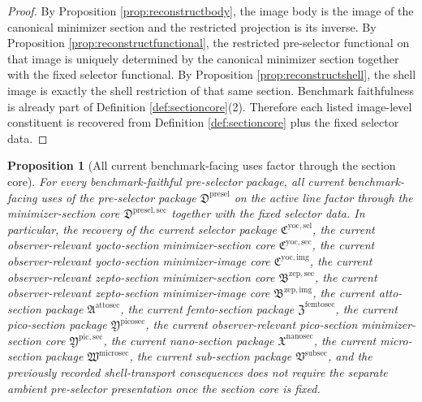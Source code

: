 \documentclass[11pt]{article}
\newcommand{\SubSectionPackage}{\mathfrak V^{\mathrm{subsec}}}
\newcommand{\MicroSectionPackage}{\mathfrak W^{\mathrm{microsec}}}
\newcommand{\NanoSectionPackage}{\mathfrak X^{\mathrm{nanosec}}}
\newcommand{\PicoSectionPackage}{\mathfrak Y^{\mathrm{picosec}}}
\newcommand{\PicoMinSectionCore}{\mathfrak Y^{\mathrm{pic,sec}}}
\newcommand{\FemtoSectionPackage}{\mathfrak Z^{\mathrm{femtosec}}}
\newcommand{\AttoSectionPackage}{\mathfrak A^{\mathrm{attosec}}}
\newcommand{\ZeptoImageCore}{\mathfrak B^{\mathrm{zep,img}}}
\newcommand{\ZeptoMinSectionCore}{\mathfrak B^{\mathrm{zep,sec}}}
\newcommand{\YoctoImageCore}{\mathfrak C^{\mathrm{yoc,img}}}
\newcommand{\YoctoMinSectionCore}{\mathfrak C^{\mathrm{yoc,sec}}}
\newcommand{\YoctoSelectorPackage}{\mathfrak C^{\mathrm{yoc,sel}}}
\newcommand{\PreSelectorPackage}{\mathfrak D^{\mathrm{presel}}}
\newcommand{\PreSelectorMinSectionCore}{\mathfrak D^{\mathrm{presel,sec}}}
\newtheorem{proposition}{Proposition}
\begin{document}
\begin{proof}
By Proposition \ref{prop:reconstructbody}, the image body is the image of the canonical minimizer section and the restricted projection is its inverse. By Proposition \ref{prop:reconstructfunctional}, the restricted pre-selector functional on that image is uniquely determined by the canonical minimizer section together with the fixed selector functional. By Proposition \ref{prop:reconstructshell}, the shell image is exactly the shell restriction of that same section. Benchmark faithfulness is already part of Definition \ref{def:sectioncore}(2). Therefore each listed image-level constituent is recovered from Definition \ref{def:sectioncore} plus the fixed selector data.
\end{proof}

\begin{proposition}[All current benchmark-facing uses factor through the section core]
\label{prop:downstream}
For every benchmark-faithful pre-selector package, all current benchmark-facing uses of the pre-selector package \(\PreSelectorPackage\) on the active line factor through the minimizer-section core \(\PreSelectorMinSectionCore\) together with the fixed selector data. In particular, the recovery of the current selector package \(\YoctoSelectorPackage\), the current observer-relevant yocto-section minimizer-section core \(\YoctoMinSectionCore\), the current observer-relevant yocto-section minimizer-image core \(\YoctoImageCore\), the current observer-relevant zepto-section minimizer-section core \(\ZeptoMinSectionCore\), the current observer-relevant zepto-section minimizer-image core \(\ZeptoImageCore\), the current atto-section package \(\AttoSectionPackage\), the current femto-section package \(\FemtoSectionPackage\), the current pico-section package \(\PicoSectionPackage\), the current observer-relevant pico-section minimizer-section core \(\PicoMinSectionCore\), the current nano-section package \(\NanoSectionPackage\), the current micro-section package \(\MicroSectionPackage\), the current sub-section package \(\SubSectionPackage\), and the previously recorded shell-transport consequences does not require the separate ambient pre-selector presentation once the section core is fixed.
\end{proposition}
\end{document}

